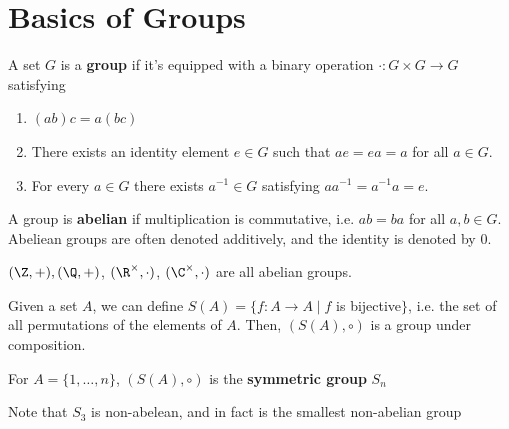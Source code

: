 
\section{Basics of Groups}

\begin{defn}
    A set $G$ is a \textbf{group} if it's equipped with a binary operation $\cdot :G \times G \to G$ satisfying
    \begin{enumerate}
        \item $(ab)c=a(bc)$
        \item There exists an identity element $e \in G$ such that $ae=ea = a$ for all $a \in G$.
        \item For every $a \in G$ there exists $a^{-1} \in G$ satisfying $aa^{-1}=a^{-1}a=e$.
    \end{enumerate}
\end{defn}

\begin{defn}
    A group is \textbf{abelian} if multiplication is commutative, i.e. $ab=ba$ for all $a,b \in G$. Abeliean groups are often denoted additively, and the identity is denoted by $0$.
\end{defn}

\begin{ex}
    $(\Z, +), (\Q,+)$, $(\R^\times, \cdot)$, $(\C^\times, \cdot)$ are all abelian groups.
\end{ex}

\begin{ex}
    Given a set $A$, we can define $S(A) = \{f:A \to A \mid f$ is bijective$\}$, i.e. the set of all permutations of the elements of $A$. Then, $(S(A), \circ)$ is a group under composition.
\end{ex}

\begin{defn}
    For $A = \{1,\dots,n\}$, $(S(A), \circ)$ is the \textbf{symmetric group} $S_n$
\end{defn}

Note that $S_3$ is non-abelean, and in fact is the smallest non-abelian group


